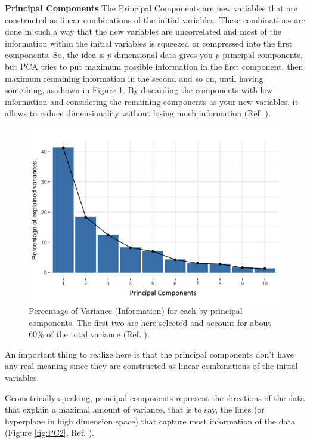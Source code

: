 \documentclass[english,notitlepage,reprint,nofootinbib]{revtex4-1}  %
\begin{document}
\textbf{Principal Components}
The Principal Components are new variables that are constructed as linear combinations of the initial variables. These combinations are done in such a way that the new variables are uncorrelated and most of the information within the initial variables is squeezed or compressed into the first components. So, the idea is $p$-dimensional data gives you $p$ principal components, but PCA tries to put maximum possible information in the first component, then maximum remaining information in the second and so on, until having something, as shown in Figure \ref{fig:PC}. By discarding the components with low information and considering the remaining components as your new variables, it allows to reduce dimensionality without losing much information (Ref. \cite{pc}).

\begin{figure}[h]
    \centering 
    \includegraphics[scale=0.3]{img/principal_components.png}
    \caption{Percentage of Variance (Information) for each by principal components. The first two are here selected and account for about $60\%$ of the total variance (Ref. \cite{pc}).}
    \label{fig:PC}
\end{figure}

An important thing to realize here is that the principal components don’t have any real meaning since they are constructed as linear combinations of the initial variables.

Geometrically speaking, principal components represent the directions of the data that explain a maximal amount of variance, that is to say, the lines (or hyperplane in high dimension space) that capture most information of the data (Figure \ref{fig:PC2}, Ref. \cite{mortens}). 
\end{document}

